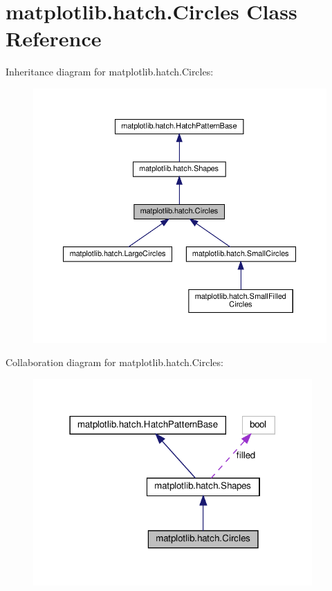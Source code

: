 \hypertarget{classmatplotlib_1_1hatch_1_1Circles}{}\section{matplotlib.\+hatch.\+Circles Class Reference}
\label{classmatplotlib_1_1hatch_1_1Circles}


Inheritance diagram for matplotlib.\+hatch.\+Circles\+:
\nopagebreak
\begin{figure}[H]
\begin{center}
\leavevmode
\includegraphics[width=350pt]{classmatplotlib_1_1hatch_1_1Circles__inherit__graph}
\end{center}
\end{figure}


Collaboration diagram for matplotlib.\+hatch.\+Circles\+:
\nopagebreak
\begin{figure}[H]
\begin{center}
\leavevmode
\includegraphics[width=302pt]{classmatplotlib_1_1hatch_1_1Circles__coll__graph}
\end{center}
\end{figure}
